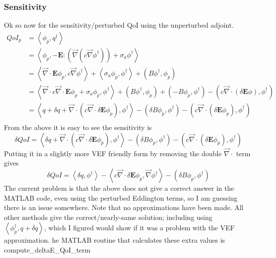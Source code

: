 \documentclass{article}
\newcommand{\bra}{\left\langle}
\newcommand{\ket}{\right\rangle}
\newcommand{\vdiv}{\vec{\nabla} \cdot}
\newcommand{\vgrad}{\vec{\nabla}}
\newcommand{\Edd}{\mathbf{E}}
\newcommand{\siga}{\sigma_a}
\newcommand{\isigt}{c}
\newcommand{\scalSource}{q}
\newcommand{\scalResp}{q^\dag}
\newcommand{\qoi}{QoI}
\begin{document}
\subsubsection{Sensitivity}
Ok so now for the sensitivity/perturbed QoI using the unperturbed adjoint. 
\begin{equation}
\begin{split}
\qoi_p&=\bra \phi_p , \scalResp \ket\\
&=\bra \phi_p , - \Edd : \left( \vgrad \left( c \vgrad \phi^\dag \right) \right) + \siga \phi^\dag \ket\\
&=\bra  \vdiv \Edd \phi_p , c \vgrad \phi^\dag  \ket + \bra \siga \phi_p , \phi^\dag \ket + \left( B \phi^\dag , \phi_p \right)\\
&= \bra  \vdiv c \vdiv \Edd \phi_p + \siga \phi_p , \phi^\dag  \ket  + \left( B \phi^\dag , \phi_p \right)+ \left( - B \phi_p , \phi^\dag \right) - \left( \isigt   \vec{\nabla} \cdot \left(\delta \Edd \phi \right) , \phi^\dag \right) \\
&= \bra  q + \delta q + \vdiv \left(\isigt\vdiv \delta \Edd \phi_p \right), \phi^\dag  \ket  - \left( \delta B \phi_p , \phi^\dag \right) - \left( \isigt   \vec{\nabla} \cdot \left(\delta \Edd \phi_p \right) , \phi^\dag \right) \\
\end{split}
\end{equation}
From the above it is easy to see the sensitivity is 
\begin{equation}
\delta \qoi = \bra  \delta q + \vdiv \left(\isigt\vdiv \delta \Edd \phi_p \right), \phi^\dag  \ket  - \left( \delta B \phi_p , \phi^\dag \right) - \left( \isigt   \vec{\nabla} \cdot \left(\delta \Edd \phi_p \right) , \phi^\dag \right)
\end{equation}
Putting it in a slightly more VEF friendly form by removing the double $\vdiv$ term gives
\begin{equation}
\delta \qoi = \bra  \delta q , \phi^\dag \ket - \bra  \isigt\vdiv \delta \Edd \phi_p , \vgrad \phi^\dag  \ket  - \left( \delta B \phi_p , \phi^\dag \right) 
\end{equation}
The current problem is that the above does not give a correct answer in the MATLAB code, even using the perturbed Eddington terms, so I am guessing there is an issue somewhere. Note that no approximations have been made. All other methods  give the correct/nearly-same solution; including using $ \bra \phi^\dag_p , \scalSource +\delta \scalSource \ket $, which I figured would show if it was a problem with the VEF approximation. he MATLAB routine that calculates these extra values is compute\_deltaE\_QoI\_term
\end{document}
